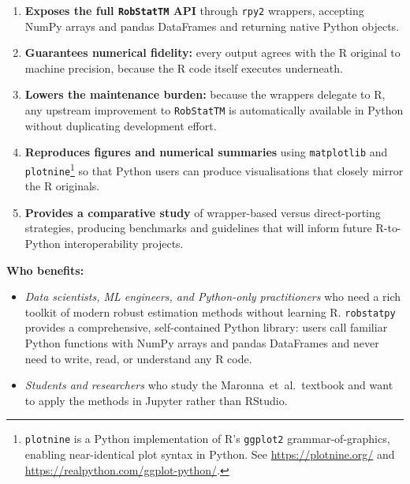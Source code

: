 \documentclass[11pt, a4paper]{article}
\begin{document}
\begin{enumerate}[leftmargin=2em]
  \item \textbf{Exposes the full \texttt{RobStatTM} API} through
    \texttt{rpy2} wrappers, accepting NumPy arrays and pandas DataFrames
    and returning native Python objects.
  \item \textbf{Guarantees numerical fidelity:} every output agrees
    with the R original to machine precision, because the R code itself
    executes underneath.
  \item \textbf{Lowers the maintenance burden:} because the wrappers
    delegate to R, any upstream improvement to \texttt{RobStatTM} is
    automatically available in Python without duplicating development
    effort.
  \item \textbf{Reproduces figures and numerical summaries} using
    \texttt{matplotlib} and \texttt{plotnine}\footnote{\texttt{plotnine}
    is a Python implementation of R's \texttt{ggplot2}
    grammar-of-graphics, enabling near-identical plot syntax in Python.
    See \url{https://plotnine.org/} and \url{https://realpython.com/ggplot-python/}.}
    so that Python users can produce visualisations that closely
    mirror the R originals.
  \item \textbf{Provides a comparative study} of wrapper-based versus
    direct-porting strategies, producing benchmarks and guidelines that
    will inform future R-to-Python interoperability projects.
\end{enumerate}

\noindent
\textbf{Who benefits:}
\begin{itemize}[leftmargin=1.5em, itemsep=2pt]
  \item \emph{Data scientists, ML engineers, and Python-only practitioners}
    who need a rich toolkit of modern robust estimation methods without
    learning R. \texttt{robstatpy} provides a comprehensive, self-contained
    Python library: users call familiar Python functions with NumPy arrays
    and pandas DataFrames and never need to write, read, or understand any
    R code.
  \item \emph{Students and researchers} who study the Maronna~et~al.\
    textbook and want to apply the methods in Jupyter rather than RStudio.
\end{itemize}

\end{document}

